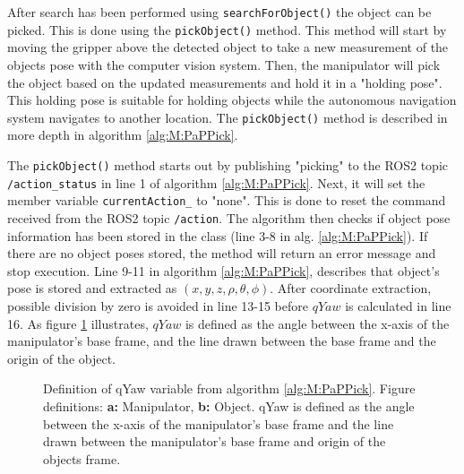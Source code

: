 


After search has been performed using \lstinline{searchForObject()} the object can be picked. This is done using the \lstinline{pickObject()}  method. This method will start by moving the gripper above the detected object to take a new measurement of the objects pose with the computer vision system. Then, the manipulator will pick the object based on the updated measurements and hold it in a "holding pose". This holding pose is suitable for holding objects while the autonomous navigation system navigates to another location. The \lstinline{pickObject()}  method is described in more depth in algorithm \ref{alg:M:PaPPick}. 



The \lstinline{pickObject()} method starts out by publishing "picking" to the ROS2 topic \lstinline{/action_status} in line 1 of algorithm \ref{alg:M:PaPPick}. Next, it will set the member variable \lstinline{currentAction_} to "none". This is done to reset the command received from the ROS2 topic \lstinline{/action}. The algorithm then checks if object pose information has been stored in the class (line 3-8 in alg. \ref{alg:M:PaPPick}). If there are no object poses stored, the method will return an error message and stop execution. Line 9-11 in algorithm \ref{alg:M:PaPPick}, describes that object's pose is stored and extracted as $(x,y,z,\rho,\theta,\phi)$. After coordinate extraction, possible division by zero is avoided in line 13-15 before $qYaw$ is calculated in line 16. As figure \ref{fig:M:PAP:M:qYaw} illustrates, $qYaw$ is defined as the angle between the x-axis of the manipulator's base frame, and the line drawn between the base frame and the origin of the object.

\begin{figure}[htp!]
  \fontsize{14}{14}\selectfont
  \centering
  
  \caption{Definition of qYaw variable from algorithm \ref{alg:M:PaPPick}. Figure definitions: \textbf{a:} Manipulator, \textbf{b:} Object. qYaw is defined as the angle between the x-axis of the manipulator's base frame and the line drawn between the manipulator's base frame and origin of the objects frame.}
  \label{fig:M:PAP:M:qYaw}
\end{figure}

